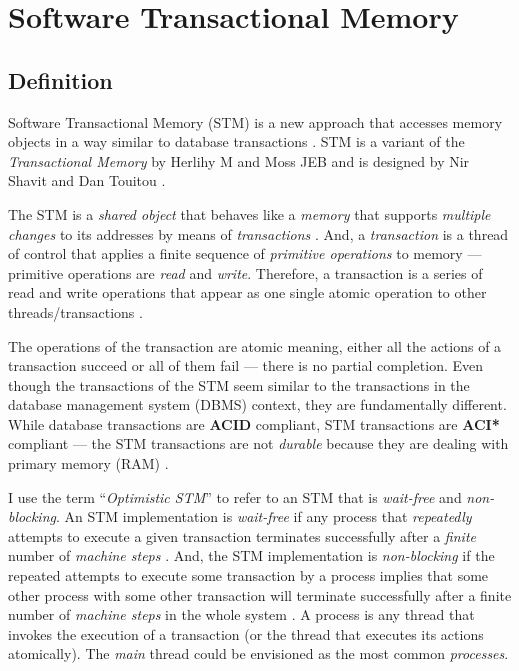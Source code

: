 \documentclass[../main]{subfiles}
\begin{document}
  \section{Software Transactional Memory}

  \subsection{Definition}

  \par
  Software Transactional Memory (STM) is a new approach that accesses memory objects in a way similar to database transactions \cite{weimerskirch2008software}. STM is a variant of the {\em Transactional Memory} by Herlihy M and Moss JEB and is designed by Nir Shavit and Dan Touitou \cite{weimerskirch2008software}\cite{Shavit1997}. \par

  The STM is a {\em shared object} that behaves like a {\em memory} that supports {\em multiple changes} to its addresses by means of {\em transactions} \cite{Shavit1997}. And, a {\em transaction} is a thread of control that applies a finite sequence of {\em primitive operations} to memory --- primitive operations are {\em read} and {\em write}. Therefore, a transaction is a series of read and write operations that appear as one single atomic operation to other threads/transactions \cite{weimerskirch2008software}. \par

  The operations of the transaction are atomic meaning, either all the actions of a transaction succeed or all of them fail --- there is no partial completion. Even though the transactions of the STM seem similar to the transactions in the database management system (DBMS) context, they are fundamentally different. While database transactions are {\bf ACID} compliant, STM transactions are {\bf ACI*} compliant --- the STM transactions are not {\em durable} because they are dealing with primary memory (RAM) \cite{weimerskirch2008software}. \par

  I use the term ``{\em Optimistic STM}'' to refer to an STM that is {\em wait-free} and {\em non-blocking}.
  An STM implementation is {\em wait-free} if any process that {\em repeatedly} attempts to execute a given transaction terminates successfully after a {\em finite} number of {\em machine steps} \cite{Shavit1997}. And, the STM implementation is {\em non-blocking} if the repeated attempts to execute some transaction by a process implies that some other process with some other transaction will terminate successfully after a finite number of {\em machine steps} in the whole system \cite{Shavit1997}. A process is any thread that invokes the execution of a transaction (or the thread that executes its actions atomically). The {\em main} thread could be envisioned as the most common {\em processes}. \par
\end{document}
